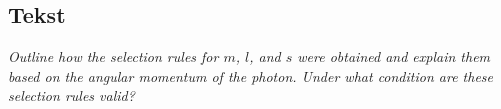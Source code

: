 \subsection{Tekst}

\emph{Outline how the selection rules for $m$, $l$, and $s$ were obtained and explain them based on the angular momentum of the photon. Under what condition are these selection rules valid?}